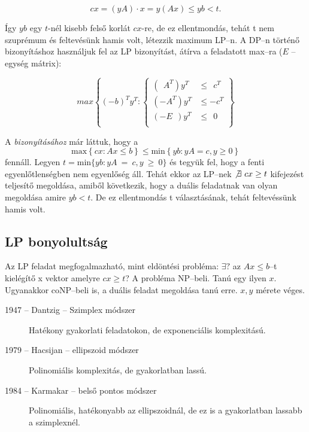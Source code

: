 \[ cx = (yA)\cdot x = y (Ax) \leq yb < t.\]

Így $yb$ egy $t$-nél kisebb felső korlát $cx$-re, de ez ellentmondás, tehát t
nem szuprémum és feltevésünk hamis volt, létezzik maximum LP--n. A DP--n történő
bizonyításhoz használjuk fel az LP bizonyítást, átírva a feladatott max--ra ($E$
-- egység mátrix):

\[ max \left\{ (-b)^T y^T :
\begin{cases}
(~~A^T)y^T    &\leq~~c^T \\
(-A^T) y^T &\leq -c^T \\
(-E~~)y^T    &\leq~~0 \\
\end{cases}  \right\} \]
 
A  \emph{bizonyításához} már láttuk, hogy a \[ \mbox{max}\left\{
cx:Ax \leq b \right\} \leq
   \mbox{min}\left\{ yb:yA = c, y \geq 0 \right\}
\] fennáll. Legyen $t=\mbox{min}\{ yb:yA~=~c, y~\geq~0 \}$ és tegyük fel, hogy a
fenti egyenlőtlenségben nem egyenlőség áll.  Tehát ekkor az LP--nek
$\not\exists~cx \geq t$ kifejezést teljesítő megoldása, amiből következik,
hogy a duális feladatnak van olyan megoldása amire $yb<t$. De ez ellentmondás t
választásának, tehát feltevéssünk hamis volt.

\subsection{LP bonyolultság}

Az LP feladat megfogalmazható, mint eldöntési probléma: $\exists?$ az $Ax \leq
b$--t kielégítő x vektor amelyre $cx\geq t$? A probléma NP--beli. Tanú egy ilyen
$x$. Ugyanakkor coNP--beli is, a duális feladat megoldása tanú erre. $x, y$
mérete véges.

\begin{description}
  \item[1947 -- Dantzig -- Szimplex módszer] Hatékony gyakorlati feladatokon, de
  exponenciális komplexitású.
  \item[1979 --  Hacsijan -- ellipszoid módszer] Polinomiális komplexitás, de
  gyakorlatban lassú.
  \item[1984 --  Karmakar -- belső pontos módszer]  Polinomiális, hatékonyabb az
  ellipszoidnál, de ez is a gyakorlatban lassabb a szimplexnél.
\end{description}